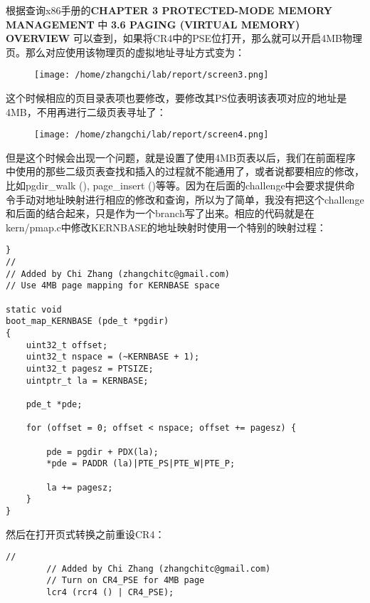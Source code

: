 \documentclass{article}
\newcommand{\funcname}[1]{{\ttfamily \small #1}}
\begin{document}
\begin{CJK*}{UTF8}{gkai}
\vspace{4em}

根据查询x86手册的{\ttfamily \bfseries CHAPTER 3 PROTECTED-MODE MEMORY MANAGEMENT} 中 {\ttfamily \bfseries 3.6 PAGING (VIRTUAL MEMORY) OVERVIEW} 可以查到，如果将CR4中的PSE位打开，那么就可以开启4MB物理页。那么对应使用该物理页的虚拟地址寻址方式变为：

\vspace{4em}

\begin{figure}[htp]
\centering
\texttt{[image: /home/zhangchi/lab/report/screen3.png]}
\end{figure}

这个时候相应的页目录表项也要修改，要修改其PS位表明该表项对应的地址是4MB，不用再进行二级页表寻址了：

\begin{figure}[htp]
\centering
\texttt{[image: /home/zhangchi/lab/report/screen4.png]}
\end{figure}

但是这个时候会出现一个问题，就是设置了使用4MB页表以后，我们在前面程序中使用的那些二级页表查找和插入的过程就不能通用了，或者说都要相应的修改，比如\funcname{pgdir\_walk ()}, \funcname{page\_insert ()}等等。因为在后面的challenge中会要求提供命令手动对地址映射进行相应的修改和查询，所以为了简单，我没有把这个challenge和后面的结合起来，只是作为一个branch写了出来。相应的代码就是在kern/pmap.c中修改KERNBASE的地址映射时使用一个特别的映射过程：

\begin{lstlisting}[style=ccode, title={\scriptsize \ttfamily \bfseries kern/pmap.c: boot\_map\_KERNBASE ()}]
}
//
// Added by Chi Zhang (zhangchitc@gmail.com)
// Use 4MB page mapping for KERNBASE space

static void
boot_map_KERNBASE (pde_t *pgdir)
{
    uint32_t offset;
    uint32_t nspace = (~KERNBASE + 1);
    uint32_t pagesz = PTSIZE;
    uintptr_t la = KERNBASE;

    pde_t *pde;

    for (offset = 0; offset < nspace; offset += pagesz) {

        pde = pgdir + PDX(la);
        *pde = PADDR (la)|PTE_PS|PTE_W|PTE_P;
       
        la += pagesz;
    }
}
\end{lstlisting}

然后在打开页式转换之前重设CR4：


\begin{lstlisting}[style=ccode, title={\scriptsize \ttfamily \bfseries kern/pmap.c: i386\_vm\_init ()}]
        //
        // Added by Chi Zhang (zhangchitc@gmail.com)
        // Turn on CR4_PSE for 4MB page
        lcr4 (rcr4 () | CR4_PSE);
	

\end{lstlisting}
\end{CJK*}
\end{document}

